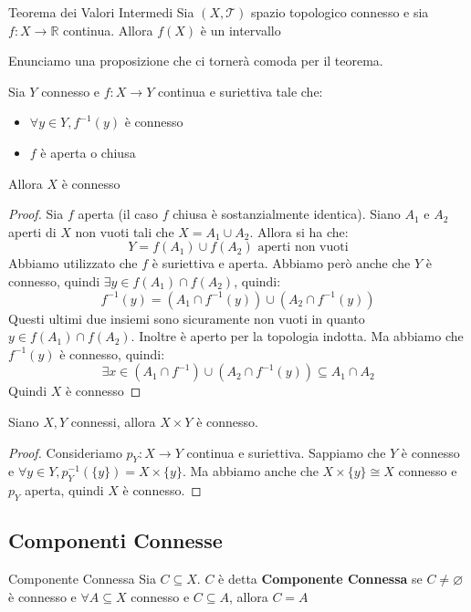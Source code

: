 \documentclass[11pt,a4paper,twoside]{article}
\theoremstyle{definition}
\begin{document}
\begin{cor}{Teorema dei Valori Intermedi}{}
	Sia $(X, \mathcal T)$ spazio topologico connesso e sia $f:X \to \mathbb R$ continua. Allora $f(X)$ è un intervallo
\end{cor}

Enunciamo una proposizione che ci tornerà comoda per il teorema.

\begin{prop}{}{}
	Sia $Y$ connesso e $f:X \to Y$ continua e suriettiva tale che:
	\begin{itemize}
		\item $\forall y \in Y, f^{-1}(y)$ è connesso
		\item $f$ è aperta o chiusa
	\end{itemize}
	Allora $X$ è connesso
\end{prop}

\begin{proof}
	Sia $f$ aperta (il caso $f$ chiusa è sostanzialmente identica). Siano $A_1$ e $A_2$ aperti di $X$ non vuoti tali che $X = A_1 \cup A_2$. Allora si ha che:
	\[ Y = f(A_1) \cup f(A_2) \text{ aperti non vuoti}\]
	Abbiamo utilizzato che $f$ è suriettiva e aperta. Abbiamo però anche che $Y$ è connesso, quindi $\exists y \in f(A_1)\cap f(A_2)$, quindi:
	\[ f^{-1}(y) = (A_1 \cap f^{-1}(y)) \cup (A_2 \cap f^{-1}(y)) \]
	Questi ultimi due insiemi sono sicuramente non vuoti in quanto $y \in f(A_1) \cap f(A_2)$. Inoltre è aperto per la topologia indotta. Ma abbiamo che $f^{-1}(y)$ è connesso, quindi:
	\[ \exists x \in (A_1 \cap f^{-1})\cup (A_2 \cap f^{-1}(y)) \subseteq A_1 \cap A_2 \]
	Quindi $X$ è connesso
\end{proof}

\begin{thm}{}{}
	Siano $X, Y$ connessi, allora $X \times Y$ è connesso.
\end{thm}
\begin{proof}
	Consideriamo $p_Y:X \to Y$ continua e suriettiva. Sappiamo che $Y$ è connesso e $\forall y \in Y, p^{-1}_Y(\{y\}) = X \times \{y\}$. Ma abbiamo anche che $X \times \{y\} \cong X$ connesso e $p_Y$ aperta, quindi $X$ è connesso.
\end{proof}

\subsection{Componenti Connesse}

\begin{defn}{Componente Connessa}{}
	Sia $C \subseteq X$. $C$ è detta \textbf{Componente Connessa} se $C \neq \varnothing$ è connesso e $\forall A \subseteq X$ connesso e $C\subseteq A$, allora $C = A$
\end{defn}
\end{document}
